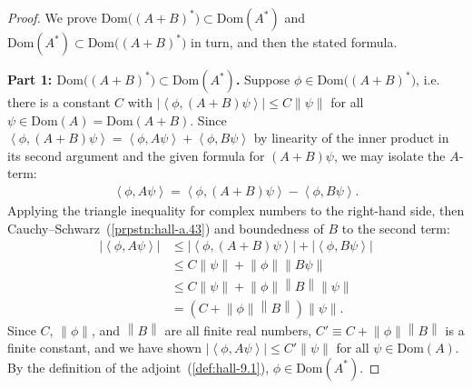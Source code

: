 \begin{proof}
    \leanok
We prove $\text{Dom}\big( (A+B)^* \big) \subset \text{Dom}(A^*)$ and $\text{Dom}(A^*) \subset \text{Dom}\big( (A+B)^* \big)$ in turn, and then the stated formula.

\textbf{Part 1: $\text{Dom}\big( (A+B)^* \big) \subset \text{Dom}(A^*)$.} Suppose $\phi \in \text{Dom}\big( (A+B)^* \big)$, i.e. there is a constant $C$ with $\lvert \left< \phi, (A+B)\psi \right> \rvert \le C \left\| \psi \right\|$ for all $\psi \in \text{Dom}(A) = \text{Dom}(A+B)$. Since $\left< \phi, (A+B)\psi \right> = \left< \phi, A\psi \right> + \left< \phi, B\psi \right>$ by linearity of the inner product in its second argument and the given formula for $(A+B)\psi$, we may isolate the $A$-term:
\begin{align}
    \left< \phi, A\psi \right> = \left< \phi, (A+B)\psi \right> - \left< \phi, B\psi \right>.
\end{align}
Applying the triangle inequality for complex numbers to the right-hand side, then Cauchy–Schwarz~(\ref{prpstn:hall-a.43}) and boundedness of $B$ to the second term:
\begin{align}
    \lvert \left< \phi, A\psi \right> \rvert &\le \lvert \left< \phi, (A+B)\psi \right> \rvert + \lvert \left< \phi, B\psi \right> \rvert \\
                                               &\le C \left\| \psi \right\| + \left\| \phi \right\| \left\| B\psi \right\| \\
                                               &\le C \left\| \psi \right\| + \left\| \phi \right\| \left\| B \right\| \left\| \psi \right\| \\
                                               &= \left( C + \left\| \phi \right\| \left\| B \right\| \right) \left\| \psi \right\|.
\end{align}
Since $C$, $\left\| \phi \right\|$, and $\left\| B \right\|$ are all finite real numbers, $C' \equiv C + \left\| \phi \right\| \left\| B \right\|$ is a finite constant, and we have shown $\lvert \left< \phi, A\psi \right> \rvert \le C' \left\| \psi \right\|$ for all $\psi \in \text{Dom}(A)$. By the definition of the adjoint~(\ref{def:hall-9.1}), $\phi \in \text{Dom}(A^*)$.


\end{proof}
